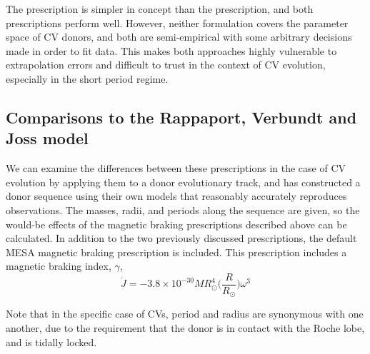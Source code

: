 The \citet{garraffo2018a} prescription is simpler in concept than the \citet{matt2015} prescription, and both prescriptions perform well. However, neither formulation covers the parameter space of CV donors, and both are semi-empirical with some arbitrary decisions made in order to fit data. This makes both approaches highly vulnerable to extrapolation errors and difficult to trust in the context of CV evolution, especially in the short period regime.


\subsection{Comparisons to the Rappaport, Verbundt and Joss model}

We can examine the differences between these prescriptions in the case of CV evolution by applying them to a donor evolutionary track, and \citet{knigge11} has constructed a donor sequence using their own models that reasonably accurately reproduces observations. The masses, radii, and periods along the sequence are given, so the would-be effects of the magnetic braking prescriptions described above can be calculated. In addition to the two previously discussed prescriptions, the default MESA \citep{Paxton_2015} magnetic braking prescription \citep{rappaport1983} is included. This prescription includes a magnetic braking index, $\gamma$,
\begin{equation}
    \dot J = -3.8\times10^{-30} M R_\odot^4 \bigg( \frac{R}{R_\odot} \bigg) \omega^3
\end{equation}

Note that in the specific case of CVs, period and radius are synonymous with one another, due to the requirement that the donor is in contact with the Roche lobe, and is tidally locked. 


